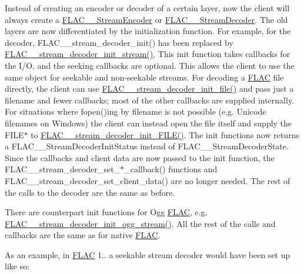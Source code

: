 Instead of creating an encoder or decoder of a certain layer, now the client will always create a \hyperlink{struct_f_l_a_c_____stream_encoder}{F\+L\+A\+C\+\_\+\+\_\+\+Stream\+Encoder} or \hyperlink{struct_f_l_a_c_____stream_decoder}{F\+L\+A\+C\+\_\+\+\_\+\+Stream\+Decoder}. The old layers are now differentiated by the initialization function. For example, for the decoder, F\+L\+A\+C\+\_\+\+\_\+stream\+\_\+decoder\+\_\+init() has been replaced by \hyperlink{group__flac__stream__decoder_ga32c28a56a2bdfa2333edbd3d991894d7}{F\+L\+A\+C\+\_\+\+\_\+stream\+\_\+decoder\+\_\+init\+\_\+stream()}. This init function takes callbacks for the I/O, and the seeking callbacks are optional. This allows the client to use the same object for seekable and non-\/seekable streams. For decoding a \hyperlink{namespace_f_l_a_c}{F\+L\+AC} file directly, the client can use \hyperlink{group__flac__stream__decoder_ga1692108a97012d1c5f79baf7df012c33}{F\+L\+A\+C\+\_\+\+\_\+stream\+\_\+decoder\+\_\+init\+\_\+file()} and pass just a filename and fewer callbacks; most of the other callbacks are supplied internally. For situations where fopen()ing by filename is not possible (e.\+g. Unicode filenames on Windows) the client can instead open the file itself and supply the F\+I\+L\+E$\ast$ to \hyperlink{group__flac__stream__decoder_ga38f9eb46bf112af205f86b4cbac9980c}{F\+L\+A\+C\+\_\+\+\_\+stream\+\_\+decoder\+\_\+init\+\_\+\+F\+I\+L\+E()}. The init functions now returns a F\+L\+A\+C\+\_\+\+\_\+\+Stream\+Decoder\+Init\+Status instead of F\+L\+A\+C\+\_\+\+\_\+\+Stream\+Decoder\+State. Since the callbacks and client data are now passed to the init function, the F\+L\+A\+C\+\_\+\+\_\+stream\+\_\+decoder\+\_\+set\+\_\+$\ast$\+\_\+callback() functions and F\+L\+A\+C\+\_\+\+\_\+stream\+\_\+decoder\+\_\+set\+\_\+client\+\_\+data() are no longer needed. The rest of the calls to the decoder are the same as before.

There are counterpart init functions for Ogg \hyperlink{namespace_f_l_a_c}{F\+L\+AC}, e.\+g. \hyperlink{group__flac__stream__decoder_ga78bf285b54e5aaee73a214c108683a72}{F\+L\+A\+C\+\_\+\+\_\+stream\+\_\+decoder\+\_\+init\+\_\+ogg\+\_\+stream()}. All the rest of the calls and callbacks are the same as for native \hyperlink{namespace_f_l_a_c}{F\+L\+AC}.

As an example, in \hyperlink{namespace_f_l_a_c}{F\+L\+AC} 1.. a seekable stream decoder would have been set up like so\+:


